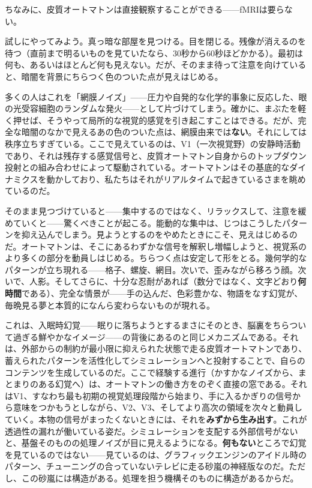 \documentclass[11pt, twoside, openright]{book}
\begin{document}
ちなみに、皮質オートマトンは直接観察することができる------fMRIは要らない。

試しにやってみよう。真っ暗な部屋を見つける。目を閉じる。残像が消えるのを待つ（直前まで明るいものを見ていたなら、30秒から60秒ほどかかる）。最初は何も、あるいはほとんど何も見えない。だが、そのまま待って注意を向けていると、暗闇を背景にちらつく色のついた点が見えはじめる。

多くの人はこれを「網膜ノイズ」------圧力や自発的な化学的事象に反応した、眼の光受容細胞のランダムな発火------として片づけてしまう。確かに、まぶたを軽く押せば、そうやって局所的な視覚的感覚を引き起こすことはできる。だが、完全な暗闇のなかで見えるあの色のついた点は、網膜由来では\textbf{ない}。それにしては秩序立ちすぎている。ここで見えているのは、V1（一次視覚野）の安静時活動であり、それは残存する感覚信号と、皮質オートマトン自身からのトップダウン投射との組み合わせによって駆動されている。オートマトンはその基底的なダイナミクスを動かしており、私たちはそれがリアルタイムで起きているさまを眺めているのだ。

そのまま見つづけていると------集中するのではなく、リラックスして、注意を緩めていくと------驚くべきことが起こる。能動的な集中は、じつはこうしたパターンを抑え込んでしまう。見ようとするのをやめたときにこそ、見えはじめるのだ。オートマトンは、そこにあるわずかな信号を解釈し増幅しようと、視覚系のより多くの部分を動員しはじめる。ちらつく点は安定して形をとる。幾何学的なパターンが立ち現れる------格子、螺旋、網目。次いで、歪みながら移ろう顔。次いで、人影。そしてさらに、十分な忍耐があれば（数分ではなく、文字どおり\textbf{何時間}である）、完全な情景が------手の込んだ、色彩豊かな、物語をなす幻覚が、毎晩見る夢と本質的になんら変わらないものが現れる。

これは、入眠時幻覚------眠りに落ちようとするまさにそのとき、脳裏をちらついて過ぎる鮮やかなイメージ------の背後にあるのと同じメカニズムである。それは、外部からの制約が最小限に抑えられた状態で走る皮質オートマトンであり、蓄えられたパターンを活性化してシミュレーションへと投射することで、自らのコンテンツを生成しているのだ。ここで経験する進行（かすかなノイズから、まとまりのある幻覚へ）は、オートマトンの働き方をのぞく直接の窓である。それはV1、すなわち最も初期の視覚処理段階から始まり、手に入るかぎりの信号から意味をつかもうとしながら、V2、V3、そしてより高次の領域を次々と動員していく。本物の信号がまったくないときには、それを\textbf{みずから生み出す}。これが透過性の漏れが働いている姿だ。シミュレーションを支配する外部信号がないと、基盤そのものの処理ノイズが目に見えるようになる。\textbf{何もない}ところで幻覚を見ているのではない------見ているのは、グラフィックエンジンのアイドル時のパターン、チューニングの合っていないテレビに走る砂嵐の神経版なのだ。ただし、この砂嵐には構造がある。処理を担う機構そのものに構造があるからだ。
\end{document}
